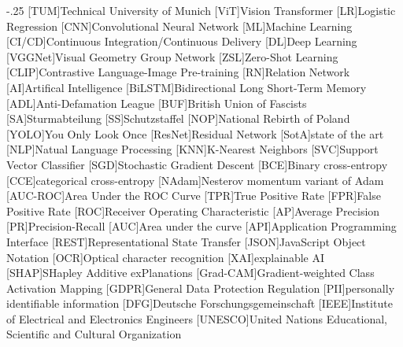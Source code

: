 \documentclass[headsepline,footsepline,footinclude=false,oneside,fontsize=11pt,paper=a4,listof=totoc,bibliography=totoc]{scrbook} %
\begin{document}
\begin{acronym}
	\itemsep-.25\baselineskip
	[TUM]{Technical University of Munich}
	[ViT]{Vision Transformer}
	[LR]{Logistic Regression}
	[CNN]{Convolutional Neural Network}
	[ML]{Machine Learning}
	[CI/CD]{Continuous Integration/Continuous Delivery}
	[DL]{Deep Learning}
	[VGGNet]{Visual Geometry Group Network}
	[ZSL]{Zero-Shot Learning}
	[CLIP]{Contrastive Language-Image Pre-training}
	[RN]{Relation Network}
	[AI]{Artifical Intelligence}
	[BiLSTM]{Bidirectional Long Short-Term Memory}
	[ADL]{Anti-Defamation League}
	[BUF]{British Union of Fascists}
	[SA]{Sturmabteilung}
	[SS]{Schutzstaffel}
	[NOP]{National Rebirth of Poland}
	[YOLO]{You Only Look Once}
	[ResNet]{Residual Network}
	[SotA]{state of the art}
	[NLP]{Natual Language Processing}
	[KNN]{K-Nearest Neighbors}
	[SVC]{Support Vector Classifier}
	[SGD]{Stochastic Gradient Descent}
	[BCE]{Binary cross-entropy}
	[CCE]{categorical cross-entropy}
	[NAdam]{Nesterov momentum variant of Adam}
	[AUC-ROC]{Area Under the ROC Curve}
	[TPR]{True Positive Rate}
	[FPR]{False Positive Rate}
	[ROC]{Receiver Operating Characteristic}
	[AP]{Average Precision}
	[PR]{Precision-Recall}
	[AUC]{Area under the curve}
	[API]{Application Programming Interface}
	[REST]{Representational State Transfer}
	[JSON]{JavaScript Object Notation}
	[OCR]{Optical character recognition}
	[XAI]{explainable AI}
	[SHAP]{SHapley Additive exPlanations}
	[Grad-CAM]{Gradient-weighted Class Activation Mapping}
	[GDPR]{General Data Protection Regulation}
	[PII]{personally identifiable information}
	[DFG]{Deutsche Forschungsgemeinschaft}
	[IEEE]{Institute of Electrical and Electronics Engineers}
	[UNESCO]{United Nations Educational, Scientific and Cultural Organization}
\end{acronym}

\listoffigures{}
\listoftables{}
\printbibliography{}
\end{document}
